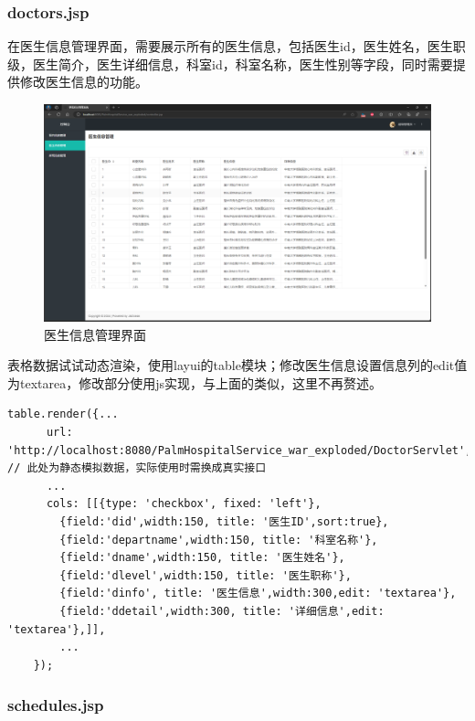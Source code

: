 \documentclass[UTF8,12pt]{article}
\begin{document}
\newpage

\subsubsection{doctors.jsp}
在医生信息管理界面，需要展示所有的医生信息，包括医生id，医生姓名，医生职级，医生简介，医生详细信息，科室id，科室名称，医生性别等字段，同时需要提供修改医生信息的功能。

\begin{figure}[htbp]
    \centering
    \includegraphics[width=1.0\textwidth]{imgs/19.png}
    \caption{医生信息管理界面}
\end{figure}

表格数据试试动态渲染，使用layui的table模块；修改医生信息设置信息列的edit值为textarea，修改部分使用js实现，与上面的类似，这里不再赘述。

\begin{lstlisting}[frame=shadowbox]
    table.render({...
      url: 'http://localhost:8080/PalmHospitalService_war_exploded/DoctorServlet', // 此处为静态模拟数据，实际使用时需换成真实接口
      ...
      cols: [[{type: 'checkbox', fixed: 'left'},
        {field:'did',width:150, title: '医生ID',sort:true},
        {field:'departname',width:150, title: '科室名称'},
        {field:'dname',width:150, title: '医生姓名'},
        {field:'dlevel',width:150, title: '医生职称'},
        {field:'dinfo', title: '医生信息',width:300,edit: 'textarea'},
        {field:'ddetail',width:300, title: '详细信息',edit: 'textarea'},]],
        ...
    });
\end{lstlisting}

\newpage

\subsubsection{schedules.jsp}
\end{document}
